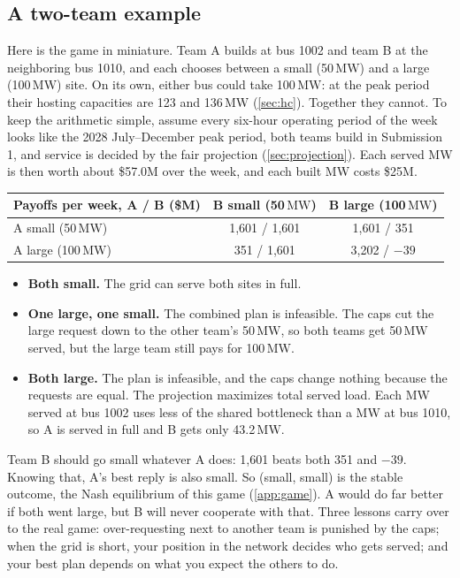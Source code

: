 \documentclass[10pt]{article}
\newcommand{\MW}{\ensuremath{\,\mathrm{MW}}}
\begin{document}
\subsection{A two-team example}\label{sec:twoteam}
Here is the game in miniature. Team A builds
at bus 1002 and team B at the neighboring bus 1010, and each chooses between a
small (50\MW) and a large (100\MW) site. On its own, either bus could take
100\MW: at the peak period their hosting capacities are 123 and 136\MW{}
(\cref{sec:hc}). Together they cannot. To keep the arithmetic simple, assume
every six-hour operating period of the week looks like the 2028 July--December peak
period, both
teams build in Submission 1, and service is decided by the fair projection
(\cref{sec:projection}). Each served MW is then worth about \$57.0M over the
week, and each built MW costs \$25M.

\begin{center}
\small
\begin{tabular}{@{}l c c@{}}
\toprule
Payoffs per week, A / B (\$M) & B small (50\MW) & B large (100\MW)\\
\midrule
A small (50\MW) & 1,601 / 1,601 & 1,601 / 351\\
A large (100\MW) & 351 / 1,601 & 3,202 / $-39$\\
\bottomrule
\end{tabular}
\end{center}

\begin{itemize}[leftmargin=*]
  \item \textbf{Both small.} The grid can serve both sites in full.
  \item \textbf{One large, one small.} The combined plan is infeasible. The
    caps cut the large request down to the other team's 50\MW, so both teams
    get 50\MW{} served, but the large team still pays for 100\MW.
  \item \textbf{Both large.} The plan is infeasible, and the caps change
    nothing because the requests are equal. The projection maximizes total
    served load. Each MW served at bus 1002 uses less of the shared
    bottleneck than a MW at bus 1010, so A is served in full and B gets only
    43.2\MW.
\end{itemize}

Team B should go small whatever A does: 1,601 beats both 351 and $-39$.
Knowing that, A's best reply is also small. So (small, small) is the stable
outcome, the Nash equilibrium of this game (\cref{app:game}). A would do far
better if both went large, but B will never cooperate with that. Three lessons
carry over to the real game: over-requesting next to another team is punished
by the caps; when the grid is short, your position in the network decides who
gets served; and your best plan depends on what you expect the others to do.
\end{document}
